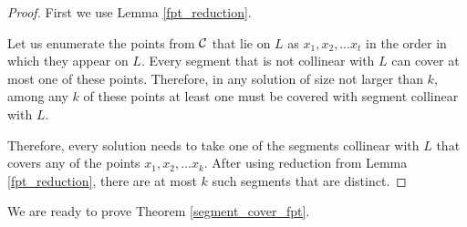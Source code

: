 \begin{proof}

First we use Lemma \ref{fpt_reduction}.

Let us enumerate the points from $\mathcal{C}$ that lie on $L$ as $x_1, x_2, \ldots x_t$
in the order in which they appear on $L$.
Every segment that is not collinear with $L$ can cover at most one of these
points. Therefore, in any solution of size not larger than $k$,
among any $k$ of these points at least one must
be covered with segment collinear with $L$.

Therefore, every solution needs to take one of the segments collinear
with $L$ that covers any of the points
$x_1, x_2, \ldots x_k$. After using reduction from Lemma \ref{fpt_reduction},
there are at most $k$ such segments that are distinct.
\end{proof}

We are ready to prove Theorem \ref{segment_cover_fpt}.

